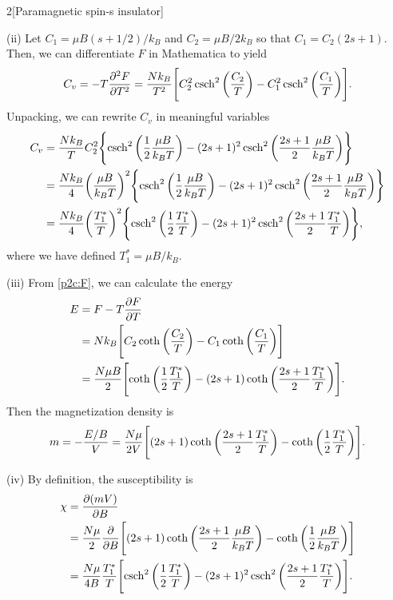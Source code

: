 \documentclass[12pt]{article}
\begin{document}
\begin{problem}{2}[Paramagnetic spin-s insulator]
\begin{solution}
(ii) Let $C_1=\mu B(s+1/2)/k_B$ and $C_2=\mu B/2k_B$ so that $C_1=C_2(2s+1)$.
Then, we can differentiate $F$ in Mathematica to yield
\begin{align}
    C_v
    =-T\frac{\partial^2 F}{\partial T^2}
    =\frac{Nk_B}{T^2}
    \qty[C_2^2\csch^2\qty(\frac{C_2}{T})-C_1^2\csch^2\qty(\frac{C_1}{T})].
\end{align}
Unpacking, we can rewrite $C_v$ in meaningful variables
\begin{align}\label{p2c:Cv}
    C_v
    &=\frac{Nk_B}{T}C_2^2\qty{\csch^2\qty(\frac{1}{2}\frac{\mu
    B}{k_BT})-(2s+1)^2\csch^2\qty(\frac{2s+1}{2}\frac{\mu
    B}{k_BT})}\notag\\
    &=\frac{Nk_B}{4}\qty(\frac{\mu B}{k_BT})^2\qty{\csch^2\qty(\frac{1}{2}\frac{\mu
    B}{k_BT})-(2s+1)^2\csch^2\qty(\frac{2s+1}{2}\frac{\mu
    B}{k_BT})}\notag\\
    &=\frac{Nk_B}{4}\qty(\frac{T_1^\ast}{T})^2\qty{\csch^2\qty(\frac12\frac{T_1^\ast}{T})-(2s+1)^2\csch^2\qty(\frac{2s+1}{2}\frac{T_1^\ast}{T})},
\end{align}
where we have defined $T_1^\ast=\mu B/k_B$.

(iii) From \eqref{p2c:F}, we can calculate the energy
\begin{align}
    E
    &=F-T\frac{\partial F}{\partial T}\notag\\
    &=Nk_B\qty[C_2\coth\qty(\frac{C_2}{T})-C_1\coth\qty(\frac{C_1}{T})]\notag\\
    &=\frac{N\mu
    B}{2}\qty[\coth\qty(\frac12\frac{T_1^\ast}{T})-(2s+1)\coth\qty(\frac{2s+1}{2}\frac{T_1^\ast}{T})].
\end{align}
Then the magnetization density is
\begin{equation}\label{p2c:m}
    m=-\frac{E/B}{V}=\frac{N\mu}{2V}\qty[(2s+1)\coth\qty(\frac{2s+1}{2}\frac{T_1^\ast}{T})-\coth\qty(\frac12\frac{T_1^\ast}{T})]
    .
\end{equation}

(iv) By definition, the susceptibility is
\begin{align}\label{p2c:m}
    \chi
    &=\frac{\partial (mV)}{\partial B}\notag\\
    &=\frac{N\mu}{2}\frac{\partial}{\partial
    B}\qty[(2s+1)\coth\qty(\frac{2s+1}{2}\frac{\mu
B}{k_BT})-\coth\qty(\frac12\frac{\mu B}{k_BT})]\notag\\
    &=\frac{N\mu}{4B}\frac{T_1^\ast}{T}\qty[\csch^2\qty(\frac12\frac{T_1^\ast}{T})-(2s+1)^2\csch^2\qty(\frac{2s+1}{2}\frac{T_1^\ast}{T})].
\end{align}
\end{solution}


\end{problem}
\end{document}
